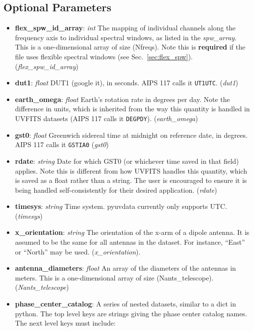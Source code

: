 \documentclass[11pt, oneside]{article}
\begin{document}
\subsection{Optional Parameters}
\label{sec:opt_params}
\begin{itemize}
\item \textbf{flex\_spw\_id\_array}: \textit{int} The mapping of individual
  channels along the frequency axis to individual spectral windows, as listed in
  the \textit{spw\_array}. This is a one-dimensional array of size
  (Nfreqs). Note this is \textbf{required} if the file uses flexible
  spectral windows (see
  Sec.~\ref{sec:flex_spw}). (\textit{flex\_spw\_id\_array})
\item \textbf{dut1}: \textit{float} DUT1 (google it), in seconds. AIPS 117 calls
  it \verb+UT1UTC+. (\textit{dut1})
\item \textbf{earth\_omega}: \textit{float} Earth's rotation rate in degrees per
  day. Note the difference in units, which is inherited from the way this
  quantity is handled in UVFITS datasets (AIPS 117 calls it \verb+DEGPDY+).
  (\textit{earth\_omega})
\item \textbf{gst0}: \textit{float} Greenwich sidereal time at midnight on
  reference date, in degrees. AIPS 117 calls it \verb+GSTIA0+ (\textit{gst0})
\item \textbf{rdate}: \textit{string} Date for which GST0 (or whichever time
  saved in that field) applies. Note this is different from how UVFITS handles
  this quantity, which is saved as a float rather than a string. The user is
  encouraged to ensure it is being handled self-consistently for their desired
  application. (\textit{rdate})
\item \textbf{timesys}: \textit{string} Time system. pyuvdata currently only
  supports UTC. (\textit{timesys})
\item \textbf{x\_orientation}: \textit{string} The orientation of the x-arm of a
  dipole antenna. It is assumed to be the same for all antennas in the
  dataset. For instance, ``East'' or ``North'' may be
  used. (\textit{x\_orientation}).
\item \textbf{antenna\_diameters}: \textit{float} An array of the diameters of
  the antennas in meters. This is a one-dimensional array of size
  (Nants\_telescope). (\textit{Nants\_telescope})
\item \textbf{phase\_center\_catalog}: A series of nested datasets, similar to
a dict in python. The top level keys are strings giving the phase center
catalog names. The next level keys must include:

\end{itemize}
\end{document}
